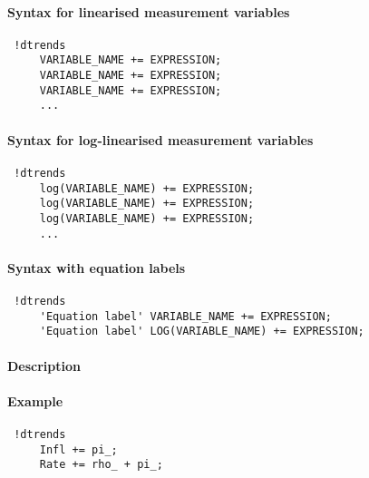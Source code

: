 


	\paragraph{Syntax for linearised measurement variables}
 
 \begin{verbatim}
 !dtrends
     VARIABLE_NAME += EXPRESSION;
     VARIABLE_NAME += EXPRESSION;
     VARIABLE_NAME += EXPRESSION;
     ...
 \end{verbatim}
 
 \paragraph{Syntax for log-linearised measurement variables}
 
 \begin{verbatim}
 !dtrends
     log(VARIABLE_NAME) += EXPRESSION;
     log(VARIABLE_NAME) += EXPRESSION;
     log(VARIABLE_NAME) += EXPRESSION;
     ...
 \end{verbatim}
 
 \paragraph{Syntax with equation labels}
 
 \begin{verbatim}
 !dtrends
     'Equation label' VARIABLE_NAME += EXPRESSION;
     'Equation label' LOG(VARIABLE_NAME) += EXPRESSION;
 \end{verbatim}
 
 \paragraph{Description}
 
 \paragraph{Example}
 
 \begin{verbatim}
 !dtrends
     Infl += pi_;
     Rate += rho_ + pi_;
 \end{verbatim}


